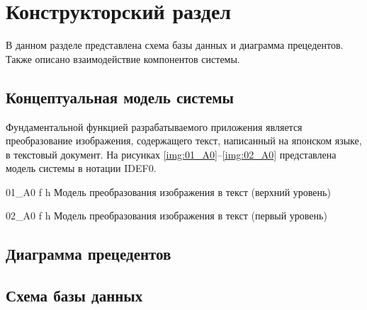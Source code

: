 \chapter{Конструкторский раздел}

В данном разделе представлена схема базы данных и диаграмма прецедентов. Также описано взаимодействие компонентов системы.

\section{Концептуальная модель системы}

Фундаментальной функцией разрабатываемого приложения является преобразование изображения, содержащего текст, написанный на японском языке, в текстовый документ. На рисунках \ref{img:01_A0}--\ref{img:02_A0} представлена модель системы в нотации IDEF0.

    {01_A0}
    {f}
    {h}
    {\linewidth}
    {Модель преобразования изображения в текст (верхний уровень)}

\clearpage

    {02_A0}
    {f}
    {h}
    {\linewidth}
    {Модель преобразования изображения в текст (первый уровень)}

\section{Диаграмма прецедентов}

\section{Схема базы данных}
